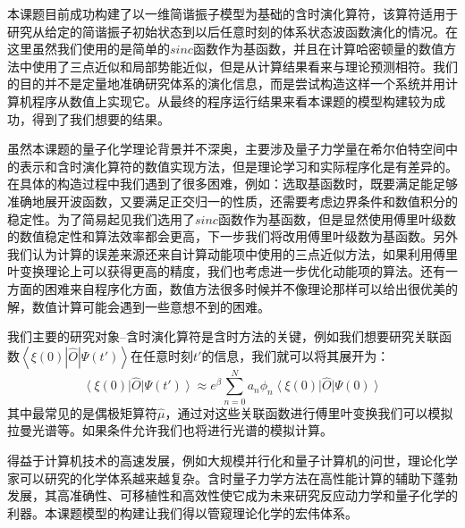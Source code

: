 
本课题目前成功构建了以一维简谐振子模型为基础的含时演化算符，该算符适用于研究从给定的简谐振子初始状态到以后任意时刻的体系状态波函数演化的情况。在这里虽然我们使用的是简单的$sinc$函数作为基函数，并且在计算哈密顿量的数值方法中使用了三点近似和局部势能近似，但是从计算结果看来与理论预测相符。我们的目的并不是定量地准确研究体系的演化信息，而是尝试构造这样一个系统并用计算机程序从数值上实现它。从最终的程序运行结果来看本课题的模型构建较为成功，得到了我们想要的结果。

虽然本课题的量子化学理论背景并不深奥，主要涉及量子力学量在希尔伯特空间中的表示和含时演化算符的数值实现方法，但是理论学习和实际程序化是有差异的。在具体的构造过程中我们遇到了很多困难，例如：选取基函数时，既要满足能足够准确地展开波函数，又要满足正交归一的性质，还需要考虑边界条件和数值积分的稳定性。为了简易起见我们选用了$sinc$函数作为基函数，但是显然使用傅里叶级数的数值稳定性和算法效率都会更高，下一步我们将改用傅里叶级数为基函数。另外我们认为计算的误差来源还来自计算动能项中使用的三点近似方法，如果利用傅里叶变换理论上可以获得更高的精度，我们也考虑进一步优化动能项的算法。还有一方面的困难来自程序化方面，数值方法很多时候并不像理论那样可以给出很优美的解，数值计算可能会遇到一些意想不到的困难。

我们主要的研究对象--含时演化算符是含时方法的关键，例如我们想要研究关联函数$\left< \xi(0) | \hat{O} | \Psi(t') \right>$在任意时刻$t'$的信息，我们就可以将其展开为：
\begin{equation*}
  \left< \xi(0) \right| \hat{O} \left| \Psi(t') \right> \approx e^{\beta} \sum_{n=0}^N a_n \phi_n \left< \xi(0)\right| \hat{O} \left| \Psi(0) \right>
\end{equation*}
其中最常见的是偶极矩算符$\hat{\mu}$，通过对这些关联函数进行傅里叶变换我们可以模拟拉曼光谱等\cite{Raman}。如果条件允许我们也将进行光谱的模拟计算。

得益于计算机技术的高速发展，例如大规模并行化和量子计算机的问世，理论化学家可以研究的化学体系越来越复杂。含时量子力学方法在高性能计算的辅助下蓬勃发展，其高准确性、可移植性和高效性使它成为未来研究反应动力学和量子化学的利器。本课题模型的构建让我们得以管窥理论化学的宏伟体系。